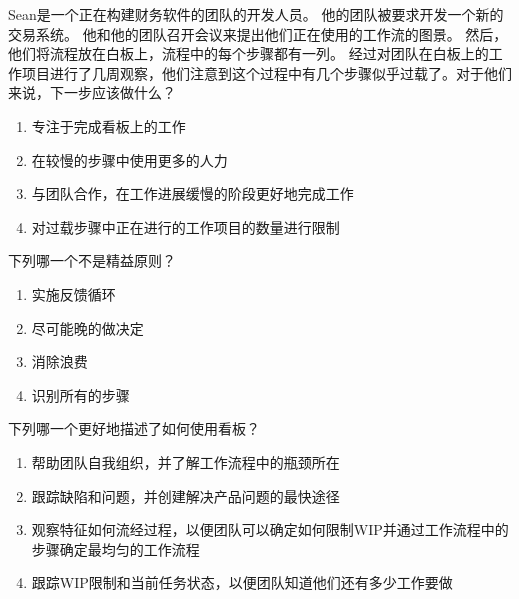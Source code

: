 \begin{problem}
	Sean是一个正在构建财务软件的团队的开发人员。 他的团队被要求开发一个新的交易系统。 他和他的团队召开会议来提出他们正在使用的工作流的图景。 然后，他们将流程放在白板上，流程中的每个步骤都有一列。 经过对团队在白板上的工作项目进行了几周观察，他们注意到这个过程中有几个步骤似乎过载了。对于他们来说，下一步应该做什么？
        \begin{enumerate}[label=\Alph*.]
            \item 专注于完成看板上的工作
            \item 在较慢的步骤中使用更多的人力
            \item 与团队合作，在工作进展缓慢的阶段更好地完成工作
            \item 对过载步骤中正在进行的工作项目的数量进行限制
        \end{enumerate}
\end{problem}




\begin{problem}
	‍下列哪一个不是精益原则？
    \vspace{-0.8em}
    \begin{multicols}{4}
        \begin{enumerate}[label=\Alph*.]
            \item 实施反馈循环
            \item 尽可能晚的做决定
            \item 消除浪费
            \item 识别所有的步骤
        \end{enumerate}
    \end{multicols}
    \vspace{-1em}
\end{problem}




\begin{problem}
	下列哪一个更好地描述了如何使用看板？
        \begin{enumerate}[label=\Alph*.]
            \item 帮助团队自我组织，并了解工作流程中的瓶颈所在
            \item 跟踪缺陷和问题，并创建解决产品问题的最快途径
            \item 观察特征如何流经过程，以便团队可以确定如何限制WIP并通过工作流程中的步骤确定最均匀的工作流程
            \item 跟踪WIP限制和当前任务状态，以便团队知道他们还有多少工作要做
        \end{enumerate}
\end{problem}




